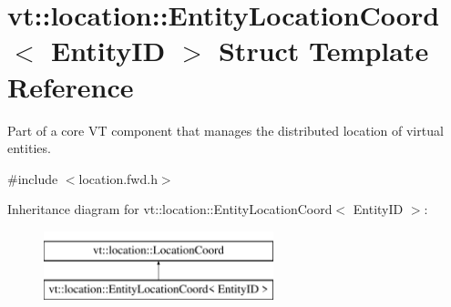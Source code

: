 \hypertarget{structvt_1_1location_1_1_entity_location_coord}{}\section{vt\+:\+:location\+:\+:Entity\+Location\+Coord$<$ Entity\+ID $>$ Struct Template Reference}
\label{structvt_1_1location_1_1_entity_location_coord}


Part of a core VT component that manages the distributed location of virtual entities.  




{\ttfamily \#include $<$location.\+fwd.\+h$>$}

Inheritance diagram for vt\+:\+:location\+:\+:Entity\+Location\+Coord$<$ Entity\+ID $>$\+:\begin{figure}[H]
\begin{center}
\leavevmode
\includegraphics[height=2.000000cm]{structvt_1_1location_1_1_entity_location_coord}
\end{center}
\end{figure}
